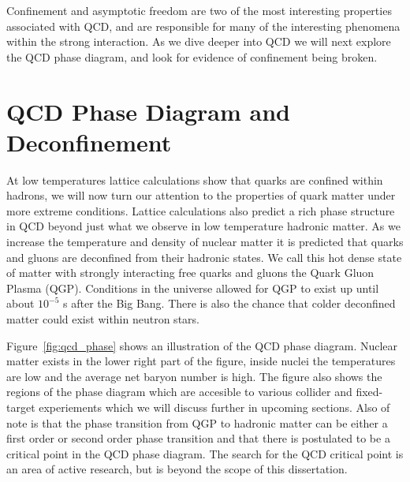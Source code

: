 Confinement and asymptotic freedom are two of the most interesting properties associated with QCD, and are responsible for many of the interesting phenomena within the strong interaction. As we dive deeper into QCD we will next explore the QCD phase diagram, and look for evidence of confinement being broken.  

\section{QCD Phase Diagram and Deconfinement}

At low temperatures lattice calculations show that quarks are confined within hadrons, we will now turn our attention to the properties of quark matter under more extreme conditions. Lattice calculations also predict a rich phase structure in QCD beyond just what we observe in low temperature hadronic matter. As we increase the temperature and density of nuclear matter it is predicted that quarks and gluons are deconfined from their hadronic states. We call this hot dense state of matter with strongly interacting free quarks and gluons the Quark Gluon Plasma (QGP). Conditions in the universe allowed for QGP to exist up until about $10^{-5}$ s after the Big Bang. There is also the chance that colder deconfined matter could exist within neutron stars.

Figure~\ref{fig:qcd_phase} shows an illustration of the QCD phase diagram. Nuclear matter exists in the lower right part of the figure, inside nuclei the temperatures are low and the average net baryon number is high. The figure also shows the regions of the phase diagram which are accesible to various collider and fixed-target experiements which we will discuss further in upcoming sections. Also of note is that the phase transition from QGP to hadronic matter can be either a first order or second order phase transition and that there is postulated to be a critical point in the QCD phase diagram. The search for the QCD critical point is an area of active research, but is beyond the scope of this dissertation. 

